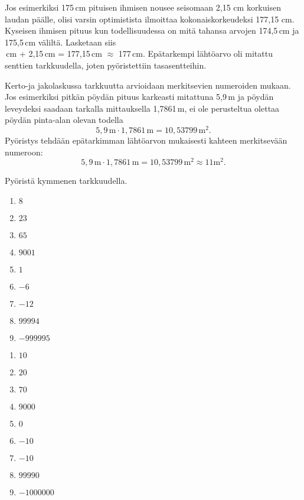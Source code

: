 Jos esimerkiksi 175\,cm pituisen ihmisen
nousee seisomaan 2,15 cm korkuisen laudan päälle, olisi varsin
optimistista ilmoittaa kokonaiskorkeudeksi 177,15 cm. Kyseisen ihmisen pituus kun todellisuudessa on mitä tahansa arvojen
174,5\,cm ja 175,5\,cm väliltä. Lasketaan siis\\
\,cm + 2,15\,cm = 177,15\,cm $\approx$ 177\,cm.
Epätarkempi lähtöarvo oli mitattu senttien tarkkuudella, joten pyöristettiin tasasentteihin.

Kerto-ja jakolaskussa tarkkuutta arvioidaan merkitsevien numeroiden mukaan. Jos esimerkiksi pitkän pöydän pituus karkeasti
mitattuna 5,9\,m ja pöydän leveydeksi saadaan tarkalla mittauksella
1,7861\,m, ei ole perusteltua olettaa pöydän pinta-alan olevan todella
\[ 5,9\,\textrm{m} \cdot 1,7861\,\textrm{m} = 10,53799\,\textrm{m}^2. \]
Pyöristys tehdään epätarkimman
lähtöarvon mukaisesti kahteen merkitsevään numeroon:
\[ 5,9\,\textrm{m} \cdot 1,7861\,\textrm{m} = 10,53799\,\textrm{m}^2 \approx 11 \textrm{m}^2.\]


\begin{tehtava}
Pyöristä kymmenen tarkkuudella.
\begin{enumerate}
\item $8$
\item $23$
\item $65$
\item $9001$
\item $1$
\item $-6$
\item $-12$
\item $99994$
\item $-999995$
\end{enumerate}
\begin{vastaus}
\begin{enumerate}
\item $10$
\item $20$
\item $70$
\item $9000$
\item $0$
\item $-10$
\item $-10$
\item $99990$
\item $-1000000$
\end{enumerate}
\end{vastaus}
\end{tehtava}

